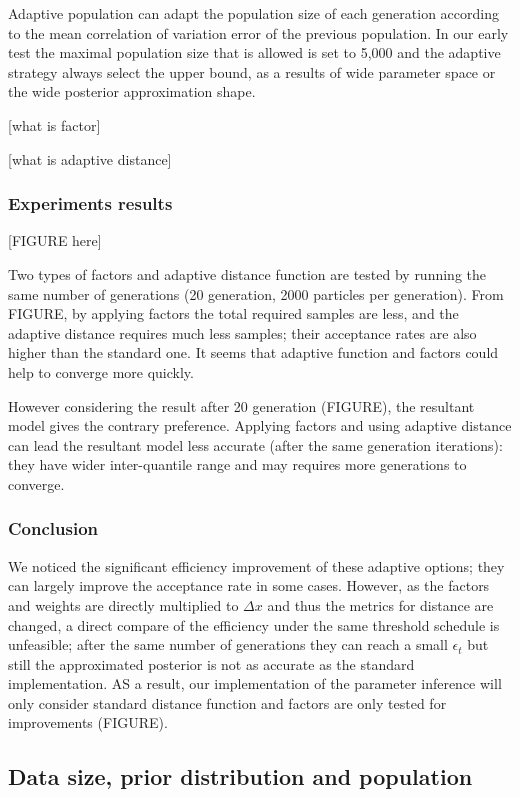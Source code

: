 \documentclass[12pt,a4paper]{report}
\begin{document}
Adaptive population \cite{ref:adpt_pop} can adapt the population size of each generation according to the mean correlation of variation error of the previous population. In our early test the maximal population size that is allowed is set to 5,000 and the adaptive strategy always select the upper bound, as a results of wide parameter space or the wide posterior approximation shape.

    [what is factor]

    [what is adaptive distance]

\subsubsection{Experiments results}

[FIGURE here]

Two types of factors and adaptive distance function are tested by running the same number of generations (20 generation, 2000 particles per generation). From FIGURE, by applying factors the total required samples are less, and the adaptive distance requires much less samples; their acceptance rates are also higher than the standard one. It seems that adaptive function and factors could help to converge more quickly.

However considering the result after 20 generation (FIGURE), the resultant model gives the contrary preference. Applying factors and using adaptive distance can lead the resultant model less accurate (after the same generation iterations): they have wider inter-quantile range and may requires more generations to converge.


\subsubsection{Conclusion} We noticed the significant efficiency improvement of these adaptive options; they can largely improve the acceptance rate in some cases. However, as the factors and weights are directly multiplied to $\Delta x$ and thus the metrics for distance are changed, a direct compare of the efficiency under the same threshold schedule is unfeasible; after the same number of generations they can reach a small $\epsilon_t$ but still the approximated posterior is not as accurate as the standard implementation. AS a result, our implementation of the parameter inference will only consider standard distance function and factors are only tested for improvements (FIGURE).


\subsection{Data size, prior distribution and population}
\end{document}

